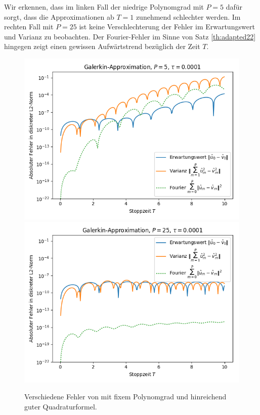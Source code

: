 Wir erkennen, dass im linken Fall der niedrige Polynomgrad mit $P=5$ dafür sorgt, dass die Approximationen ab $T=1$ zunehmend schlechter werden. Im rechten Fall mit $P=25$ ist keine Verschlechterung der Fehler im Erwartungswert und Varianz zu beobachten. Der Fourier-Fehler im Sinne von Satz \ref{th:adapted22} hingegen zeigt einen gewissen Aufwärtstrend bezüglich der Zeit $T$.
\begin{figure}[!htb]
  \includegraphics[width=\linewidth]{Figures/galerkin_bystoptime_trial1_fixeddegree5.png}
\endminipage
{}
  \includegraphics[width=\linewidth]{Figures/galerkin_bystoptime_trial1_fixeddegree25.png}
\endminipage
  \caption{Verschiedene Fehler von  mit fixem Polynomgrad und hinreichend guter Quadraturformel.}
  \label{fig:galerkin_bystoptime_trial1}
\end{figure}
